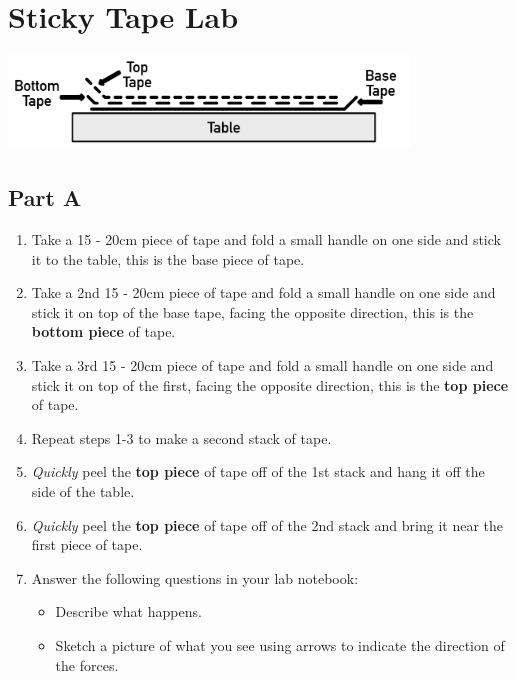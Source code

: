 \documentclass[14pt, fleqn, paper=letter, oneside]{scrartcl}
\newcommand{\maintitle}{Sticky Tape Lab}
\begin{document}
\section*{\maintitle}

{\centering
\includegraphics[width=0.8\textwidth]{StickyTapeDiagram}

}

\subsection*{Part A}
\begin{enumerate}
\item Take a 15 - 20cm piece of tape and fold a small handle on one side and stick it to the table, this is the base piece of tape.
\item Take a 2nd 15 - 20cm piece of tape and fold a small handle on one side and stick it on top of the base tape, facing the opposite direction, this is the \textbf{bottom piece} of tape.
\item Take a 3rd 15 - 20cm piece of tape and fold a small handle on one side and stick it on top of the first, facing the opposite direction, this is the \textbf{top piece} of tape.
\item Repeat steps 1-3 to make a second stack of tape.
\item \emph{Quickly} peel the \textbf{top piece} of tape off of the 1st stack and hang it off the side of the table.
\item \emph{Quickly} peel the \textbf{top piece} of tape off of the 2nd stack and bring it near the first piece of tape.
\item Answer the following questions in your lab notebook:
	\begin{itemize}
	\item Describe what happens.
	\item Sketch a picture of what you see using arrows to indicate the direction of the forces.
	\end{itemize}
\end{enumerate}

\clearpage
\end{document}
